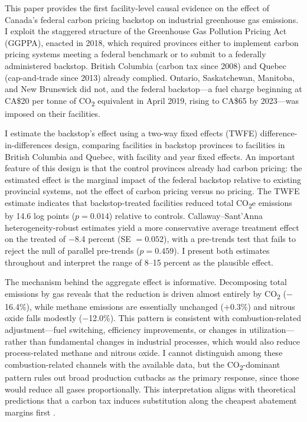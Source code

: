 \documentclass[12pt]{article}
\begin{document}
This paper provides the first facility-level causal evidence on the effect of Canada's federal carbon pricing backstop on industrial greenhouse gas emissions. I exploit the staggered structure of the Greenhouse Gas Pollution Pricing Act (GGPPA), enacted in 2018, which required provinces either to implement carbon pricing systems meeting a federal benchmark or to submit to a federally administered backstop. British Columbia (carbon tax since 2008) and Quebec (cap-and-trade since 2013) already complied. Ontario, Saskatchewan, Manitoba, and New Brunswick did not, and the federal backstop---a fuel charge beginning at CA\$20 per tonne of CO\textsubscript{2} equivalent in April 2019, rising to CA\$65 by 2023---was imposed on their facilities.

I estimate the backstop's effect using a two-way fixed effects (TWFE) difference-in-differences design, comparing facilities in backstop provinces to facilities in British Columbia and Quebec, with facility and year fixed effects. An important feature of this design is that the control provinces already had carbon pricing: the estimated effect is the marginal impact of the federal backstop relative to existing provincial systems, not the effect of carbon pricing versus no pricing. The TWFE estimate indicates that backstop-treated facilities reduced total CO\textsubscript{2}e emissions by 14.6 log points ($p = 0.014$) relative to controls. Callaway--Sant'Anna \citeyearpar{Callaway2021} heterogeneity-robust estimates yield a more conservative average treatment effect on the treated of $-$8.4 percent (SE $= 0.052$), with a pre-trends test that fails to reject the null of parallel pre-trends ($p = 0.459$). I present both estimates throughout and interpret the range of 8--15 percent as the plausible effect.

The mechanism behind the aggregate effect is informative. Decomposing total emissions by gas reveals that the reduction is driven almost entirely by CO\textsubscript{2} ($-$16.4\%), while methane emissions are essentially unchanged ($+$0.3\%) and nitrous oxide falls modestly ($-$12.0\%). This pattern is consistent with combustion-related adjustment---fuel switching, efficiency improvements, or changes in utilization---rather than fundamental changes in industrial processes, which would also reduce process-related methane and nitrous oxide. I cannot distinguish among these combustion-related channels with the available data, but the CO\textsubscript{2}-dominant pattern rules out broad production cutbacks as the primary response, since those would reduce all gases proportionally. This interpretation aligns with theoretical predictions that a carbon tax induces substitution along the cheapest abatement margins first \citep{Goulder2013, Acemoglu2012}.
\end{document}
